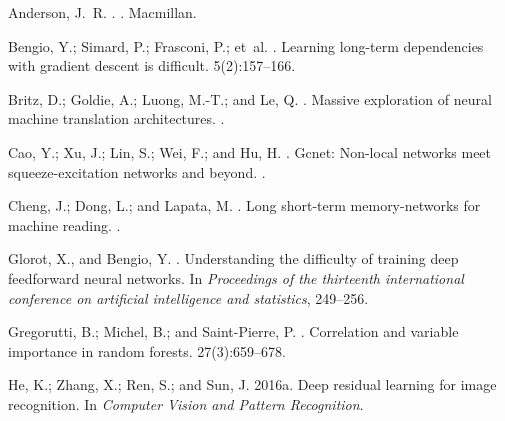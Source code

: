 \documentclass[letterpaper]{article} \usepackage{aaai20}  \usepackage{times}  \usepackage{helvet} \usepackage{courier}  \usepackage[hyphens]{url}  \usepackage{graphicx} \urlstyle{rm} \def\UrlFont{\rm}  \usepackage{graphicx}  \frenchspacing  \setlength{\pdfpagewidth}{8.5in}  \setlength{\pdfpageheight}{11in}  \usepackage{color}
\begin{document}
 	
\begin{thebibliography}{}
	
	Anderson, J.~R.
	.
	.
	\newblock Macmillan.
	
	Bengio, Y.; Simard, P.; Frasconi, P.; et~al.
	.
	\newblock Learning long-term dependencies with gradient descent is difficult.
	 5(2):157--166.
	
	Britz, D.; Goldie, A.; Luong, M.-T.; and Le, Q.
	.
	\newblock Massive exploration of neural machine translation architectures.
	.
	
	Cao, Y.; Xu, J.; Lin, S.; Wei, F.; and Hu, H.
	.
	\newblock Gcnet: Non-local networks meet squeeze-excitation networks and
	beyond.
	.
	
	Cheng, J.; Dong, L.; and Lapata, M.
	.
	\newblock Long short-term memory-networks for machine reading.
	.
	
	Glorot, X., and Bengio, Y.
	.
	\newblock Understanding the difficulty of training deep feedforward neural
	networks.
	\newblock In {\em Proceedings of the thirteenth international conference on
		artificial intelligence and statistics},  249--256.
	
	Gregorutti, B.; Michel, B.; and Saint-Pierre, P.
	.
	\newblock Correlation and variable importance in random forests.
	 27(3):659--678.
	
	He, K.; Zhang, X.; Ren, S.; and Sun, J.
	\newblock 2016a.
	\newblock Deep residual learning for image recognition.
	\newblock In {\em Computer Vision and Pattern Recognition}.
	

\end{thebibliography}
\end{document}
